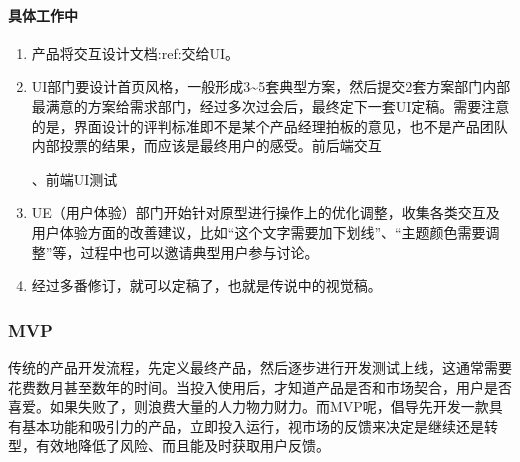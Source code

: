 \documentclass[letterpaper,10pt,english]{sphinxmanual}
\begin{document}
\paragraph{具体工作中}
\label{\detokenize{chapter_knowledge/IXD_design:id6}}\begin{enumerate}
%
\item {} 
产品将交互设计文档:ref:交给UI。

\item {} 
UI部门要设计首页风格，一般形成3\textasciitilde{}5套典型方案，然后提交2套方案部门内部最满意的方案给需求部门，经过多次过会后，最终定下一套UI定稿。需要注意的是，界面设计的评判标准即不是某个产品经理拍板的意见，也不是产品团队内部投票的结果，而应该是最终用户的感受。前后端交互%
\begin{footnote}[633]\sphinxAtStartFootnote
{}
%
\end{footnote}、前端UI测试%
\begin{footnote}[634]\sphinxAtStartFootnote
{}
%
\end{footnote}

\item {} 
UE（用户体验）部门开始针对原型进行操作上的优化调整，收集各类交互及用户体验方面的改善建议，比如“这个文字需要加下划线”、“主题颜色需要调整”等，过程中也可以邀请典型用户参与讨论。

\item {} 
经过多番修订，就可以定稿了，也就是传说中的视觉稿。

\end{enumerate}


\subsubsection{MVP}
\label{\detokenize{chapter_knowledge/MVP:mvp}}\label{\detokenize{chapter_knowledge/MVP::doc}}
传统的产品开发流程，先定义最终产品，然后逐步进行开发测试上线，这通常需要花费数月甚至数年的时间。当投入使用后，才知道产品是否和市场契合，用户是否喜爱。如果失败了，则浪费大量的人力物力财力。而MVP呢，倡导先开发一款具有基本功能和吸引力的产品，立即投入运行，视市场的反馈来决定是继续还是转型，有效地降低了风险、而且能及时获取用户反馈。
\end{document}
